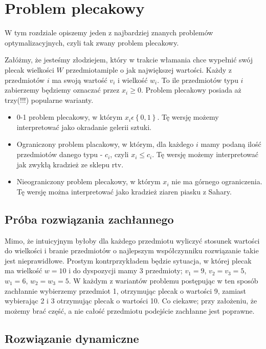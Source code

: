 \section{Problem plecakowy}

\label{sec:plecaki}

W tym rozdziale opiszemy jeden z najbardziej znanych problemów optymalizacyjnych, czyli tak zwany problem plecakowy.

Załóżmy, że jesteśmy złodziejem, który w trakcie włamania chce wypełnić swój plecak wielkości $W$ przedmiotamiple o jak największej wartości.
Każdy z przedmiotów $i$ ma swoją wartość $v_i$ i wielkość $w_i$.
To ile przedmiotów typu $i$ zabierzemy będziemy oznaczać przez $x_i \geq 0$.
Problem plecakowy posiada aż trzy(!!!) popularne warianty.


\begin{itemize}
  \item 0-1 problem plecakowy, w którym $x_i \epsilon \left \{ 0, 1 \right \}$.
  Tę wersję możemy interpretować jako okradanie gelerii sztuki.
  \item Ograniczony problem placakowy, w którym, dla każdego $i$ mamy podaną ilość przedmiotów danego typu - $c_i$, czyli $x_i \leq c_i$.
  Tę wersję możemy interpretować jak zwykłą kradzież ze sklepu rtv.
  \item Nieograniczony problem plecakowy, w którym $x_i$ nie ma górnego ograniczenia.
  Tę wersję można interpretować jako kradzież ziaren piasku z Sahary.
\end{itemize}

\subsection{Próba rozwiązania zachłannego}
Mimo, że intuicyjnym byłoby dla każdego przedmiotu wyliczyć stosunek wartości do wielkości i branie przedmiotów
o najlepszym współczynniku rozwiązanie takie jest nieprawidłowe.
Prostym kontrprzykładem będzie sytuacja, w której plecak ma wielkość $w = 10$ i do dyspozycji mamy 3 przedmioty;
$v_1=9$, $v_2=v_3=5$, $w_1=6$, $w_2=w_3=5$. W każdym z wariantów problemu postępując w ten sposób zachłannie wybierzemy przedmiot 1,
otrzymując plecak o wartości 9, zamiast wybierając 2 i 3 otrzymując plecak o wartości 10. 
Co ciekawe; przy założeniu, że możemy brać część, a nie całość przedmiotu podejście zachłanne jest poprawne.

\subsection{Rozwiązanie dynamiczne}
